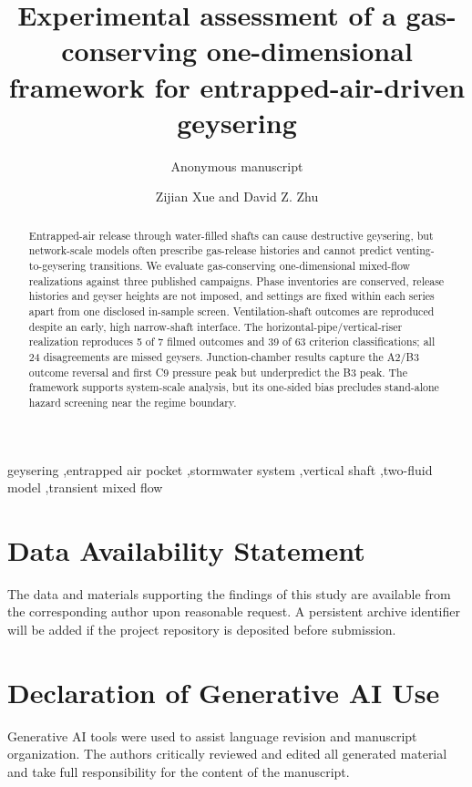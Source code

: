 \documentclass[preprint,review,12pt]{elsarticle}
\begin{document}
\begin{frontmatter}

\title{Experimental assessment of a gas-conserving one-dimensional framework for
entrapped-air-driven geysering}

\ifdefined\anonymoussubmission
\author{Anonymous manuscript}
\else
\author{Zijian Xue and David Z. Zhu}
\fi

\begin{abstract}
Entrapped-air release through water-filled shafts can cause destructive
geysering, but network-scale models often prescribe gas-release histories and
cannot predict venting-to-geysering transitions. We evaluate gas-conserving
one-dimensional mixed-flow realizations against three published campaigns.
Phase inventories are conserved, release histories and geyser heights are not
imposed, and settings are fixed within each series apart from one disclosed
in-sample screen. Ventilation-shaft outcomes are reproduced despite an early,
high narrow-shaft interface. The horizontal-pipe/vertical-riser realization
reproduces 5 of 7 filmed outcomes and 39 of 63 criterion classifications; all
24 disagreements are missed geysers. Junction-chamber results capture the
A2/B3 outcome reversal and first C9 pressure peak but underpredict the B3 peak.
The framework supports system-scale analysis, but its one-sided bias precludes
stand-alone hazard screening near the regime boundary.
\end{abstract}

\begin{keyword}
geysering \sep entrapped air pocket \sep stormwater system \sep vertical shaft
\sep two-fluid model \sep transient mixed flow
\end{keyword}

\end{frontmatter}
\linenumbers






\section*{Data Availability Statement}

The data and materials supporting the findings of this study are available
from the corresponding author upon reasonable request. A persistent archive
identifier will be added if the project repository is deposited before
submission.

\section*{Declaration of Generative AI Use}

Generative AI tools were used to assist language revision and manuscript
organization. The authors critically reviewed and edited all generated
material and take full responsibility for the content of the manuscript.



\end{document}
